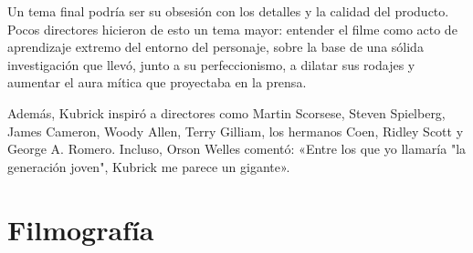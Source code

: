 \documentclass[12pt,a4paper]{article}
\begin{document}
Un tema final podría ser su obsesión con los detalles y la calidad del producto. Pocos directores hicieron de esto un tema mayor: entender el filme como acto de aprendizaje extremo del entorno del personaje, sobre la base de una sólida investigación que llevó, junto a su perfeccionismo, a dilatar sus rodajes y aumentar el aura mítica que proyectaba en la prensa.

Además, Kubrick inspiró a directores como Martin Scorsese, Steven Spielberg, James Cameron, Woody Allen, Terry Gilliam, los hermanos Coen, Ridley Scott y George A. Romero. Incluso, Orson Welles comentó: «Entre los que yo llamaría "la generación joven", Kubrick me parece un gigante».

\section{Filmografía }
\end{document}
